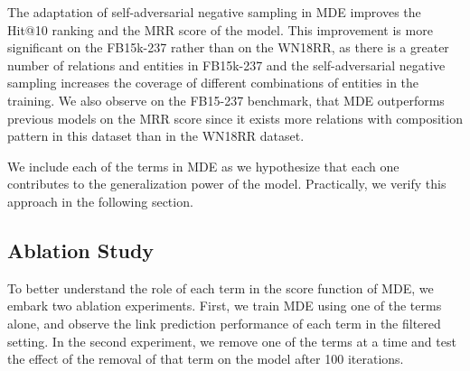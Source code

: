 \documentclass{ecai}
\begin{document}
The adaptation of self-adversarial negative sampling in MDE improves the Hit@10 ranking and the MRR score of the model. This improvement is more significant on the FB15k-237 rather than on the WN18RR, as there is a greater number of relations and entities in FB15k-237 and the self-adversarial negative sampling increases the coverage of different combinations of entities in the training.
We also observe on the FB15-237 benchmark, that MDE outperforms previous models on the MRR score since it exists more relations with composition pattern in this dataset than in the WN18RR dataset.















We include each of the terms in MDE as we hypothesize that each one contributes to the generalization power of the model. Practically, we verify this approach in the following section.




\subsection{Ablation Study}
To better understand the role of each term in the score function of MDE, we embark two ablation experiments. First, we train MDE using one of the terms alone, and observe the link prediction performance of each term in the filtered setting. In the second experiment, we remove one of the terms at a time and test the effect of the removal of that term on the model after 100 iterations.

\begin{table}\centering
{}
    \caption{Results of each individual term in MDE on WN18RR and FB15k-237. Best results are in bold.}
\label{tab:ab1-wn18RR-fb15k-237}
\end{table}
\end{document}
